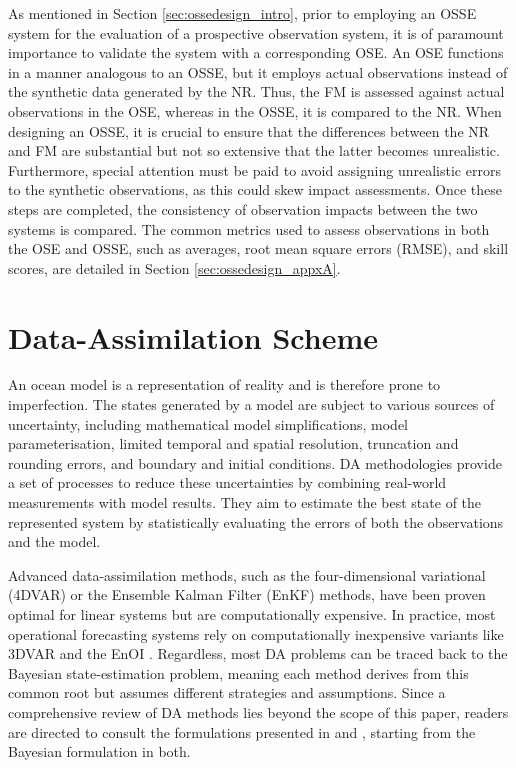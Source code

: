 As mentioned in Section \ref{sec:ossedesign_intro}, prior to employing an OSSE system for the evaluation of a prospective observation system, it is of paramount importance to validate the system with a corresponding OSE. An OSE functions in a manner analogous to an OSSE, but it employs actual observations instead of the synthetic data generated by the NR. Thus, the FM is assessed against actual observations in the OSE, whereas in the OSSE, it is compared to the NR. When designing an OSSE, it is crucial to ensure that the differences between the NR and FM are substantial but not so extensive that the latter becomes unrealistic. Furthermore, special attention must be paid to avoid assigning unrealistic errors to the synthetic observations, as this could skew impact assessments. Once these steps are completed, the consistency of observation impacts between the two systems is compared. The common metrics used to assess observations in both the OSE and OSSE, such as averages, root mean square errors (RMSE), and skill scores, are detailed in Section \ref{sec:ossedesign_appxA}.

\section{Data-Assimilation Scheme} \label{sec:ossedesign_da}
An ocean model is a representation of reality and is therefore prone to imperfection. The states generated by a model are subject to various sources of uncertainty, including mathematical model simplifications, model parameterisation, limited temporal and spatial resolution, truncation and rounding errors, and boundary and initial conditions. DA methodologies provide a set of processes to reduce these uncertainties by combining real-world measurements with model results. They aim to estimate the best state of the represented system by statistically evaluating the errors of both the observations and the model.

Advanced data-assimilation methods, such as the four-dimensional variational (4DVAR) or the Ensemble Kalman Filter (EnKF) methods, have been proven optimal for linear systems but are computationally expensive. In practice, most operational forecasting systems rely on computationally inexpensive variants like 3DVAR and the EnOI \parencite{martin2025data}. Regardless, most DA problems can be traced back to the Bayesian state-estimation problem, meaning each method derives from this common root but assumes different strategies and assumptions. Since a comprehensive review of DA methods lies beyond the scope of this paper, readers are directed to consult the formulations presented in \textcite{carrassi2018data} and \textcite{evensen2022data}, starting from the Bayesian formulation in both.

